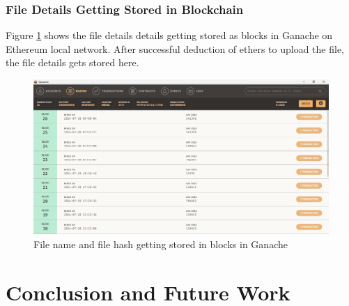 \documentclass[12pt,a4paper]{report}
\begin{document}
\subsection{File Details Getting Stored in Blockchain}
Figure \ref{fig:ganache} shows the file details details getting stored as blocks in Ganache\cite{ganachedocs} on Ethereum\cite{ethereumdocs} local network. After successful deduction of ethers to upload the file, the file details gets stored here.

\begin{figure}[hbtp]
    \centering
    \includegraphics[scale=0.4]{./pic/ganache.png}
    \caption{File name and file hash getting stored in blocks in Ganache}
    \label{fig:ganache}
\end{figure}


\chapter{Conclusion and Future Work}
\end{document}
